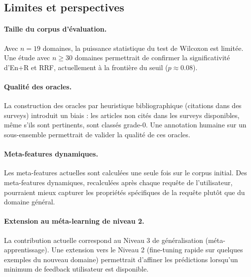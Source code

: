 \subsection{Limites et perspectives}

\paragraph{Taille du corpus d'évaluation.}
Avec $n = 19$ domaines, la puissance statistique du test de Wilcoxon est
limitée. Une étude avec $n \geq 30$ domaines permettrait de confirmer la
significativité d'En+R et RRF, actuellement à la frontière du seuil ($p \approx 0.08$).

\paragraph{Qualité des oracles.}
La construction des oracles par heuristique bibliographique (citations
dans des surveys) introduit un biais : les articles non cités dans les
surveys disponibles, même s'ils sont pertinents, sont classés grade-0.
Une annotation humaine sur un sous-ensemble permettrait de valider la
qualité de ces oracles.

\paragraph{Meta-features dynamiques.}
Les meta-features actuelles sont calculées une seule fois sur le corpus
initial. Des meta-features dynamiques, recalculées après chaque requête
de l'utilisateur, pourraient mieux capturer les propriétés spécifiques
de la requête plutôt que du domaine général.

\paragraph{Extension au méta-learning de niveau 2.}
La contribution actuelle correspond au Niveau 3 de généralisation
(méta-apprentissage). Une extension vers le Niveau 2 (fine-tuning rapide
sur quelques exemples du nouveau domaine) permettrait d'affiner les
prédictions lorsqu'un minimum de feedback utilisateur est disponible.
